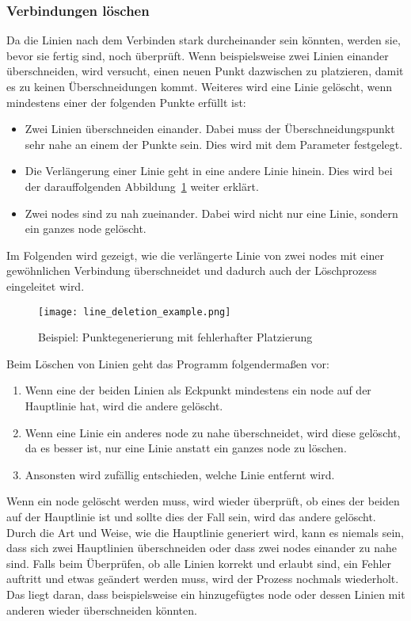 \subsubsection{Verbindungen löschen}\label{subsubsec:verbindungen-loeschen}
Da die Linien nach dem Verbinden stark durcheinander sein könnten, werden sie, bevor sie fertig sind, noch überprüft.
Wenn beispielsweise zwei Linien einander überschneiden, wird versucht, einen neuen Punkt dazwischen zu platzieren, damit es zu keinen Überschneidungen kommt.
Weiteres wird eine Linie gelöscht, wenn mindestens einer der folgenden Punkte erfüllt ist:
\begin{itemize}
    \item Zwei Linien überschneiden einander.
    Dabei muss der Überschneidungspunkt sehr nahe an einem der Punkte sein.
    Dies wird mit dem Parameter  festgelegt.
    \item Die Verlängerung einer Linie geht in eine andere Linie hinein.
    Dies wird bei der darauffolgenden Abbildung~\ref{fig:line-deletion} weiter erklärt.
    \item Zwei nodes sind zu nah zueinander.
    Dabei wird nicht nur eine Linie, sondern ein ganzes node gelöscht.
\end{itemize}

Im Folgenden wird gezeigt, wie die verlängerte Linie von zwei nodes mit einer gewöhnlichen Verbindung überschneidet und dadurch auch der Löschprozess eingeleitet wird.
\begin{figure}[H]
    \centering
    \texttt{[image: line\_deletion\_example.png]}
    \caption{Beispiel: Punktegenerierung mit fehlerhafter Platzierung}\label{fig:line-deletion}
\end{figure}

Beim Löschen von Linien geht das Programm folgendermaßen vor:
\begin{enumerate}
    \item Wenn eine der beiden Linien als Eckpunkt mindestens ein node auf der Hauptlinie hat, wird die andere gelöscht.
    \item Wenn eine Linie ein anderes node zu nahe überschneidet, wird diese gelöscht, da es besser ist, nur eine Linie anstatt ein ganzes node zu löschen.
    \item Ansonsten wird zufällig entschieden, welche Linie entfernt wird.
\end{enumerate}

Wenn ein node gelöscht werden muss, wird wieder überprüft, ob eines der beiden auf der Hauptlinie ist und sollte dies der Fall sein, wird das andere gelöscht.
Durch die Art und Weise, wie die Hauptlinie generiert wird, kann es niemals sein, dass sich zwei Hauptlinien überschneiden oder dass zwei nodes einander zu nahe sind.
Falls beim Überprüfen, ob alle Linien korrekt und erlaubt sind, ein Fehler auftritt und etwas geändert werden muss, wird der Prozess nochmals wiederholt.
Das liegt daran, dass beispielsweise ein hinzugefügtes node oder dessen Linien mit anderen wieder überschneiden könnten.

